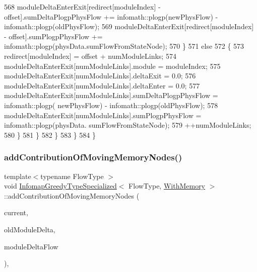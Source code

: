 \begin{DoxyCode}
568                     moduleDeltaEnterExit[redirect[moduleIndex] - offset].sumDeltaPlogpPhysFlow += 
      infomath::plogp(newPhysFlow) - infomath::plogp(oldPhysFlow);
569                     moduleDeltaEnterExit[redirect[moduleIndex] - offset].sumPlogpPhysFlow += 
      infomath::plogp(physData.sumFlowFromStateNode);
570                 \}
571                 \textcolor{keywordflow}{else}
572                 \{
573                     redirect[moduleIndex] = offset + numModuleLinks;
574                     moduleDeltaEnterExit[numModuleLinks].module = moduleIndex;
575                     moduleDeltaEnterExit[numModuleLinks].deltaExit = 0.0;
576                     moduleDeltaEnterExit[numModuleLinks].deltaEnter = 0.0;
577                     moduleDeltaEnterExit[numModuleLinks].sumDeltaPlogpPhysFlow = infomath::plogp(
      newPhysFlow) - infomath::plogp(oldPhysFlow);
578                     moduleDeltaEnterExit[numModuleLinks].sumPlogpPhysFlow = infomath::plogp(physData.
      sumFlowFromStateNode);
579                     ++numModuleLinks;
580                 \}
581             \}
582         \}
583     \}
584 \}
\end{DoxyCode}
\mbox{\label{classInfomapGreedyTypeSpecialized_3_01FlowType_00_01WithMemory_01_4_afce65e489f9881a44582fd56bd76b675}} 
\subsubsection{\texorpdfstring{add\+Contribution\+Of\+Moving\+Memory\+Nodes()}{addContributionOfMovingMemoryNodes()}\hspace{0.1cm}{\footnotesize\ttfamily [2/2]}}
{\footnotesize\ttfamily template$<$typename Flow\+Type $>$ \\
void \mbox{\hyperlink{classInfomapGreedyTypeSpecialized}{Infomap\+Greedy\+Type\+Specialized}}$<$ Flow\+Type, \mbox{\hyperlink{structWithMemory}{With\+Memory}} $>$\+::add\+Contribution\+Of\+Moving\+Memory\+Nodes (\begin{DoxyParamCaption}\item[{\mbox{\hyperlink{classMemNode}{Node\+Type}} \&}]{current,  }\item[{\mbox{\hyperlink{structMemDeltaFlow}{Delta\+Flow\+Type}} \&}]{old\+Module\+Delta,  }\item[{std\+::map$<$ unsigned int, \mbox{\hyperlink{structMemDeltaFlow}{Delta\+Flow\+Type}} $>$ \&}]{module\+Delta\+Flow }\end{DoxyParamCaption})\hspace{0.3cm}{\ttfamily [inline]}, {\ttfamily [protected]}}

